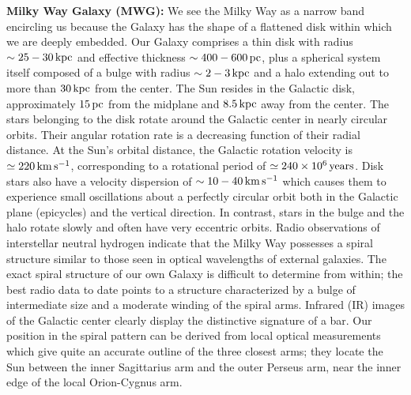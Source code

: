 \documentclass[a4paper,10pt]{article}
\begin{document}
{\noindent}\textbf{Milky Way Galaxy (MWG):} We see the Milky Way as a narrow band encircling us because the Galaxy has the shape of a flattened disk within which we are deeply embedded. Our Galaxy comprises a thin disk with radius $\sim25-30\,{\rm kpc}$ and effective thickness $\sim400-600\,{\rm pc}$, plus a spherical system itself composed of a bulge with radius $\sim2-3\,{\rm kpc}$ and a halo extending out to more than $30\,{\rm kpc}$ from the center. The Sun resides in the Galactic disk, approximately $15\,{\rm pc}$ from the midplane and $8.5\,{\rm kpc}$ away from the center. The stars belonging to the disk rotate around the Galactic center in nearly circular orbits. Their angular rotation rate is a decreasing function of their radial distance. At the Sun's orbital distance, the Galactic rotation velocity is $\simeq220\,{\rm km\,s^{-1}}$, corresponding to a rotational period of $\simeq240\times10^6\,{\rm years}$. Disk stars also have a velocity dispersion of $\sim10-40\,{\rm km\,s^{-1}}$ which causes them to experience small oscillations about a perfectly circular orbit both in the Galactic plane (epicycles) and the vertical direction. In contrast, stars in the bulge and the halo rotate slowly and often have very eccentric orbits. Radio observations of interstellar neutral hydrogen indicate that the Milky Way possesses a spiral structure similar to those seen in optical wavelengths of external galaxies. The exact spiral structure of our own Galaxy is difficult to determine from within; the best radio data to date points to a structure characterized by a bulge of intermediate size and a moderate winding of the spiral arms. Infrared (IR) images of the Galactic center clearly display the distinctive signature of a bar. Our position in the spiral pattern can be derived from local optical measurements which give quite an accurate outline of the three closest arms; they locate the Sun between the inner Sagittarius arm and the outer Perseus arm, near the inner edge of the local Orion-Cygnus arm.
\end{document}
